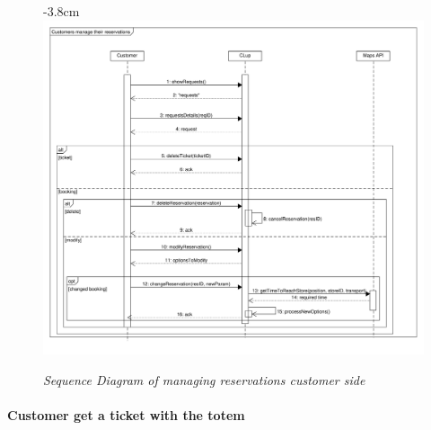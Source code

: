 \documentclass{article}
\begin{document}
			\begin{figure}[!htb]
				\begin{adjustwidth} {-3.8cm}{}
					\centering
					\includegraphics[scale=0.5]{SD/10_manageReservation(customer).pdf}\\
					\caption{\emph{Sequence Diagram of managing reservations customer side}}
				\end{adjustwidth}
			\end{figure}
		\newpage
		
			\paragraph{Customer get a ticket with the totem}
			
\end{document}
